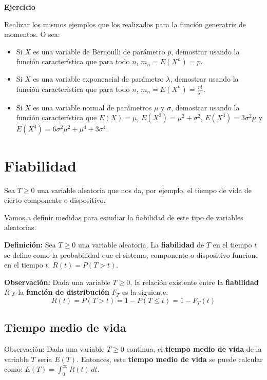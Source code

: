 \documentclass[
  letterpaper,
  DIV=11,
  numbers=noendperiod]{scrreprt}
\begin{document}
\textbf{Ejercicio}

Realizar los mismos ejemplos que los realizados para la función
generatriz de momentos. O sea:

\begin{itemize}
\item
  Si \(X\) es una variable de Bernoulli de parámetro \(p\), demostrar
  usando la función característica que para todo \(n\),
  \(m_n = E\left(X^n\right)=p\).
\item
  Si \(X\) es una variable exponencial de parámetro \(\lambda\),
  demostrar usando la función característica que para todo \(n\),
  \(m_n = E\left(X^n\right)=\frac{n!}{\lambda^n}\).
\item
  Si \(X\) es una variable normal de parámetros \(\mu\) y \(\sigma\),
  demostrar usando la función característica que \(E(X)=\mu\),
  \(E\left(X^2\right)=\mu^2+\sigma^2\),
  \(E\left(X^3\right)=3\sigma^2\mu\) y
  \(E\left(X^4\right)=6\sigma^2\mu^2+\mu^4+3\sigma^4\).
\end{itemize}

\hypertarget{fiabilidad}{%
\section{Fiabilidad}\label{fiabilidad}}

Sea \(T\geq 0\) una variable aleatoria que nos da, por ejemplo, el
tiempo de vida de cierto componente o dispositivo.

Vamos a definir medidas para estudiar la fiabilidad de este tipo de
variables aleatorias.

\textbf{Definición:} Sea \(T\geq 0\) una variable aleatoria. La
\textbf{fiabilidad} de \(T\) en el tiempo \(t\) se define como la
probabilidad que el sistema, componente o dispositivo funcione en el
tiempo \(t\): \(R(t)=P(T>t)\).

\textbf{Observación:} Dada una variable \(T\geq 0\), la relación
existente entre la \textbf{fiabilidad} \(R\) y la \textbf{función de
distribución} \(F_T\) es la siguiente: \[
R(t)=P(T>t)=1-P(T\leq t)=1-F_T (t)
\]

\hypertarget{tiempo-medio-de-vida}{%
\subsection{Tiempo medio de vida}\label{tiempo-medio-de-vida}}

Observación: Dada una variable \(T\geq 0\) continua, el \textbf{tiempo
medio de vida} de la variable \(T\) sería \(E(T)\). Entonces, este
\textbf{tiempo medio de vida} se puede calcular como:
\(E(T)=\int_0^\infty R(t)\, dt.\)
\end{document}
